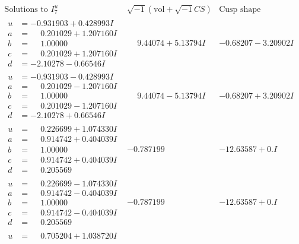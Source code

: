 \documentclass[1p]{elsarticle_modified}
\theoremstyle{definition}
\newcommand{\I}{\sqrt{-1}}
\begin{document}
$$\begin{array}{c|c|c}  
\text{Solutions to }I^u_{7}& \I (\text{vol} + \sqrt{-1}CS) & \text{Cusp shape}\\
 \hline 
\begin{aligned}
u &= -0.931903 + 0.428993 I \\
a &= \phantom{-}0.201029 + 1.207160 I \\
b &= \phantom{-}1.00000\phantom{ +0.000000I} \\
c &= \phantom{-}0.201029 + 1.207160 I \\
d &= -2.10278 - 0.66546 I\end{aligned}
 & \phantom{-}9.44074 + 5.13794 I & -0.68207 - 3.20902 I \\ \hline\begin{aligned}
u &= -0.931903 - 0.428993 I \\
a &= \phantom{-}0.201029 - 1.207160 I \\
b &= \phantom{-}1.00000\phantom{ +0.000000I} \\
c &= \phantom{-}0.201029 - 1.207160 I \\
d &= -2.10278 + 0.66546 I\end{aligned}
 & \phantom{-}9.44074 - 5.13794 I & -0.68207 + 3.20902 I \\ \hline\begin{aligned}
u &= \phantom{-}0.226699 + 1.074330 I \\
a &= \phantom{-}0.914742 + 0.404039 I \\
b &= \phantom{-}1.00000\phantom{ +0.000000I} \\
c &= \phantom{-}0.914742 + 0.404039 I \\
d &= \phantom{-}0.205569\phantom{ +0.000000I}\end{aligned}
 & -0.787199\phantom{ +0.000000I} & -12.63587 + 0. I\phantom{ +0.000000I} \\ \hline\begin{aligned}
u &= \phantom{-}0.226699 - 1.074330 I \\
a &= \phantom{-}0.914742 - 0.404039 I \\
b &= \phantom{-}1.00000\phantom{ +0.000000I} \\
c &= \phantom{-}0.914742 - 0.404039 I \\
d &= \phantom{-}0.205569\phantom{ +0.000000I}\end{aligned}
 & -0.787199\phantom{ +0.000000I} & -12.63587 + 0. I\phantom{ +0.000000I} \\ \hline\begin{aligned}
u &= \phantom{-}0.705204 + 1.038720 I \\

\end{aligned}
\end{array}$$
\end{document}

